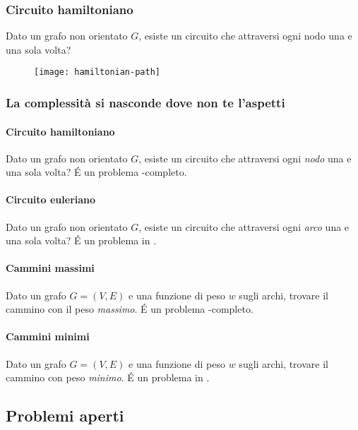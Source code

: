 \begin{minipage}[c]{.7\textwidth}
\subsubsection*{Circuito hamiltoniano}

Dato un grafo non orientato \(G\), esiste un circuito che attraversi ogni nodo una e una sola volta?
\end{minipage}%
\begin{minipage}[c]{.3\textwidth}
\begin{figure}[H]\centering
    \texttt{[image: hamiltonian-path]}
\end{figure}
\end{minipage}

\subsubsection{La complessità si nasconde dove non te l'aspetti}

\paragraph{Circuito hamiltoniano}
Dato un grafo non orientato \(G\), esiste un circuito che attraversi ogni \emph{nodo} una e una sola volta?
\'E un problema {\NP}-completo.

\paragraph{Circuito euleriano}
Dato un grafo non orientato \(G\), esiste un circuito che attraversi ogni \emph{arco} una e una sola volta?
\'E un problema in {\PTIME}.

\paragraph{Cammini massimi}
Dato un grafo \(G = (V,E)\) e una funzione di peso \(w\) sugli archi, trovare il cammino con il peso \emph{massimo}.
\'E un problema {\NP}-completo.

\paragraph{Cammini minimi}
Dato un grafo \(G = (V,E)\) e una funzione di peso \(w\) sugli archi, trovare il cammino con peso \emph{minimo}.
\'E un problema in {\PTIME}.

\subsection{Problemi aperti}

